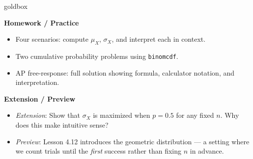 \documentclass[10pt]{article}
\begin{document}
\begin{skillbox}{goldbox}
\begin{minipage}[t]{0.48\linewidth}
    \textbf{Homework / Practice}
    \begin{itemize}
        \item Four scenarios: compute $\mu_X$, $\sigma_X$, and interpret each
              in context.
        \item Two cumulative probability problems using \texttt{binomcdf}.
        \item AP free-response: full solution showing formula, calculator
              notation, and interpretation.
    \end{itemize}
\end{minipage}
\hfill
\begin{minipage}[t]{0.48\linewidth}
    \textbf{Extension / Preview}
    \begin{itemize}
        \item \textit{Extension}: Show that $\sigma_X$ is maximized when
              $p = 0.5$ for any fixed $n$. Why does this make intuitive sense?
        \item \textit{Preview}: Lesson 4.12 introduces the geometric distribution
              --- a setting where we count trials until the \emph{first} success
              rather than fixing $n$ in advance.
    \end{itemize}
\end{minipage}
\end{skillbox}
\end{document}

